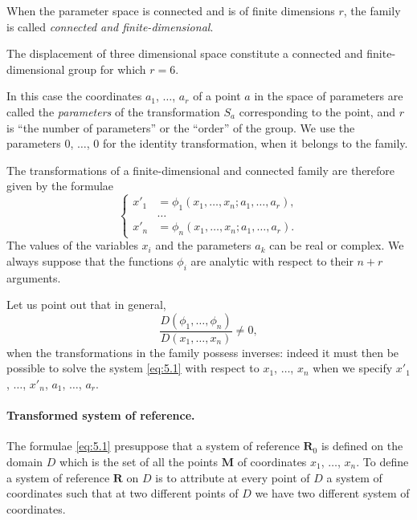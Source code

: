 When the parameter space is connected and is of finite dimensions $r$, the family is called \emph{connected and finite-dimensional}.

\begin{ex}
  The displacement of three dimensional space constitute a connected and finite-dimensional group for which $r=6$.
\end{ex}

In this case the coordinates $a_{1}$, $\dots$, $a_{r}$ of a point $a$ in the space of parameters are called the \emph{parameters} of the transformation $S_{a}$ corresponding to the point, and $r$ is ``the number of parameters'' or the ``order'' of the group. We use the parameters $0$, $\dots$, $0$ for the identity transformation, when it belongs to the family.

The transformations of a finite-dimensional and connected family are therefore given by the formulae
\begin{equation}
  \label{eq:5.1}
  \left\{
    \begin{aligned}
      x'_{1}&=\phi_{1}(x_{1},\dots,x_{n};a_{1},\dots,a_{r}),\\
      &\dots\\
      x'_{n}&=\phi_{n}(x_{1},\dots,x_{n};a_{1},\dots,a_{r}).
    \end{aligned}
  \right.
\end{equation}
The values of the variables $x_{i}$ and the parameters $a_{k}$ can be real or complex. We always suppose that the functions $\phi_{i}$ are analytic with respect to their $n+r$ arguments.

Let us point out that in general,
\begin{equation}
  \label{eq:5.2}
  \frac{D(\phi_{1},\dots,\phi_{n})}{D(x_{1},\dots,x_{n})}\neq 0,
\end{equation}
when the transformations in the family possess inverses: indeed it must then be possible to solve the system \eqref{eq:5.1} with respect to $x_{1}$, $\dots$, $x_{n}$ when we specify $x'_{1}$, $\dots$, $x'_{n}$, $a_1$, $\dots$, $a_{r}$.

\paragraph{Transformed system of reference.}
\label{sec:61}
The formulae \eqref{eq:5.1} presuppose that a system of reference $\mathbf{R}_{0}$ is defined on the domain $D$ which is the set of all the points $\mathbf{M}$ of coordinates $x_{1}$, $\dots$, $x_{n}$. To define a system of reference $\mathbf{R}$ on $D$ is to attribute at every point of $D$ a system of coordinates such that at two different points of $D$ we have two different system of coordinates.

